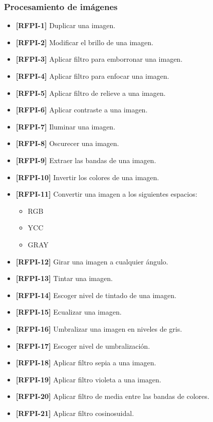 \subsubsection{Procesamiento de imágenes}
\begin{itemize}
\item{\textbf{[RFPI-1]} Duplicar una imagen.}
\item{\textbf{[RFPI-2]} Modificar el brillo de una imagen.}
\item{\textbf{[RFPI-3]} Aplicar filtro para emborronar una imagen.}
\item{\textbf{[RFPI-4]} Aplicar filtro para enfocar una imagen.}
\item{\textbf{[RFPI-5]} Aplicar filtro de relieve a una imagen.}
\item{\textbf{[RFPI-6]} Aplicar contraste a una imagen.}
\item{\textbf{[RFPI-7]} Iluminar una imagen.}
\item{\textbf{[RFPI-8]} Oscurecer una imagen.}
\item{\textbf{[RFPI-9]} Extraer las bandas de una imagen.}
\item{\textbf{[RFPI-10]} Invertir los colores de una imagen.}
\item{\textbf{[RFPI-11]} Convertir una imagen a los siguientes espacios:
\begin{itemize}
\item{RGB}
\item{YCC}
\item{GRAY}
\end{itemize}
}
\item{\textbf{[RFPI-12]} Girar una imagen a cualquier ángulo.}
\item{\textbf{[RFPI-13]} Tintar una imagen.}
\item{\textbf{[RFPI-14]} Escoger nivel de tintado de una imagen.}
\item{\textbf{[RFPI-15]} Ecualizar una imagen.}
\item{\textbf{[RFPI-16]} Umbralizar una imagen en niveles de gris.}
\item{\textbf{[RFPI-17]} Escoger nivel de umbralización.}
\item{\textbf{[RFPI-18]} Aplicar filtro sepia a una imagen.}
\item{\textbf{[RFPI-19]} Aplicar filtro violeta a una imagen.}
\item{\textbf{[RFPI-20]} Aplicar filtro de media entre las bandas de colores.}
\item{\textbf{[RFPI-21]} Aplicar filtro cosinosuidal.}
\end{itemize}
